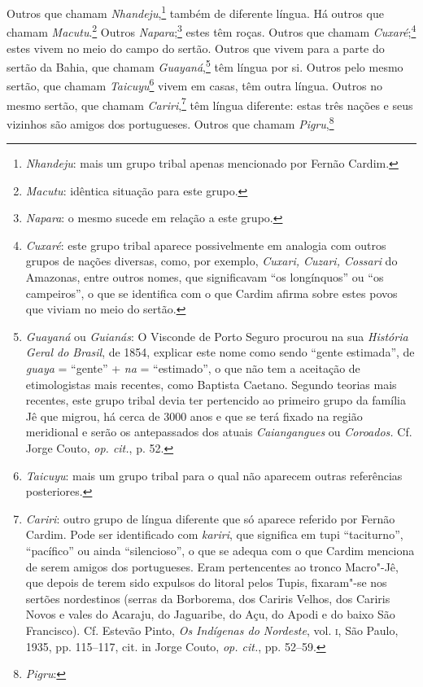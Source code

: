 \begin{linenumbers}
 Outros que chamam \textit{Nhandeju},\footnote{ \textit{Nhandeju}: 
mais um grupo tribal apenas mencionado por Fernão Cardim.} 
também de diferente língua. Há outros que chamam 
\textit{Macutu}.\footnote{ \textit{Macutu}: idêntica situação para este
grupo.} Outros \textit{Napara};\footnote{ \textit{Napara}: o
mesmo sucede em relação a este grupo.} estes têm roças. Outros
que chamam \textit{Cuxaré};\footnote{ \textit{Cuxaré}: este grupo
tribal aparece possivelmente em analogia com outros grupos de nações
diversas, como, por exemplo, \textit{Cuxari, Cuzari, Cossari} do
Amazonas, entre outros nomes, que significavam ``os longínquos'' ou ``os
campeiros'', o que se identifica com o que Cardim afirma sobre estes
povos que viviam no meio do sertão.} estes vivem no meio do
campo do sertão. Outros que vivem para a parte do sertão da Bahia, que
chamam \textit{Guayaná},\footnote{ \textit{Guayaná} ou \textit{Guianás}: 
O Visconde de Porto Seguro procurou na sua \textit{História Geral
do Brasil}, de 1854, explicar este nome como sendo ``gente estimada'', de
\textit{guaya} = ``gente'' + \textit{na} = ``estimado'', o que não tem a
aceitação de etimologistas mais recentes, como Baptista Caetano.
Segundo teorias mais recentes, este grupo tribal devia ter pertencido ao
primeiro grupo da família Jê que migrou, há cerca de 3000 anos e que se
terá fixado na região meridional e serão os antepassados dos atuais
\textit{Caiangangues} ou \textit{Coroados.} Cf. Jorge Couto,
\textit{op. cit.}, p. 52.} têm língua por si. Outros
pelo mesmo sertão, que chamam \textit{Taicuyu}\footnote{ \textit{Taicuyu}: 
mais um grupo tribal para o qual não aparecem outras
referências posteriores.} vivem em casas, têm outra língua.
Outros no mesmo sertão, que chamam \textit{Cariri},\footnote{ \textit{Cariri}: 
outro grupo de língua diferente que só aparece
referido por Fernão Cardim. Pode ser identificado com \textit{kariri}, 
que significa em tupi ``taciturno'', ``pacífico'' ou ainda ``silencioso'',
o que se adequa com o que Cardim menciona de serem amigos dos
portugueses. Eram pertencentes ao tronco Macro"-Jê, que depois de terem
sido expulsos do litoral pelos Tupis, fixaram"-se nos sertões
nordestinos (serras da Borborema, dos Cariris Velhos, dos Cariris Novos
e vales do Acaraju, do Jaguaribe, do Açu, do Apodi e do baixo São
Francisco). Cf. Estevão Pinto, \textit{Os Indígenas do Nordeste}, vol.
\textsc{i}, São Paulo, 1935, pp. 115--117, cit. in Jorge Couto, \textit{op. cit.}, 
pp. 52--59.} têm língua diferente: estas três nações e seus
vizinhos são amigos dos portugueses. Outros que chamam \textit{Pigru},\footnote{ \textit{Pigru}: 
}
\end{linenumbers}
